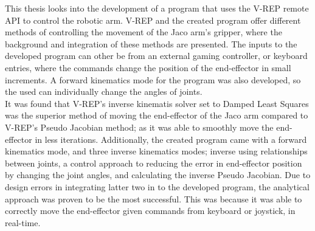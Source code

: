 \documentclass[12pt,openany,a4paper]{book}
\begin{document}
This thesis looks into the development of a program that uses the V-REP remote API to control the robotic arm. V-REP and the created program offer different methods of controlling the movement of the Jaco arm's gripper, where the background and integration of these methods are presented. The inputs to the developed program can other be from an external gaming controller, or keyboard entries, where the commands change the position of the end-effector in small increments. A forward kinematics mode for the program was also developed, so the used can individually change the angles of joints.\\

It was found that V-REP's inverse kinematis solver set to Damped Least Squares was the superior method of moving the end-effector of the Jaco arm compared to V-REP's Pseudo Jacobian method; as it was able to smoothly move the end-effector in less iterations. Additionally, the created program came with a forward kinematics mode, and three inverse kinematics modes; inverse using relationships between joints, a control approach to reducing the error in end-effector position by changing the joint angles, and calculating the inverse Pseudo Jacobian. Due to design errors in integrating latter two in to the developed program, the analytical approach was proven to be the most successful. This was because it was able to correctly move the end-effector given commands from keyboard or joystick, in real-time.\\
%
\end{document}
